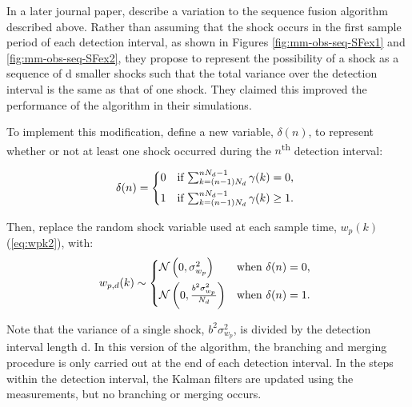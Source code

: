 In a later journal paper, \cite{robertson_method_1998} describe a variation to the sequence fusion algorithm described above.  Rather than assuming that the shock occurs in the first sample period of each detection interval, as shown in Figures \ref{fig:mm-obs-seq-SFex1} and \ref{fig:mm-obs-seq-SFex2}, they propose to represent the possibility of a shock as a sequence of \gls{d} smaller shocks such that the total variance over the detection interval is the same as that of one shock. They claimed this improved the performance of the algorithm in their simulations.

To implement this modification, define a new variable, $\delta(n)$, to represent whether or not at least one shock occurred during the $n$\textsuperscript{th} detection interval:

\begin{equation} \label{eq:deltak}
	\delta(n) = \begin{cases*}
		0 & \text{if} $\sum_{k=(n-1) N_d}^{n N_d - 1}{\gamma(k)} = 0$, \\
		1 & \text{if} $\sum_{k=(n-1) N_d}^{n N_d - 1}{\gamma(k)} \ge 1$.
	\end{cases*}
\end{equation}

Then, replace the random shock variable used at each sample time, $w_p(k)$ (\ref{eq:wpk2}), with:
\begin{equation} \label{eq:wpdk}
	w_{p,d}(k) \sim 
	\begin{cases*}
		\mathcal{N}\left(0, \sigma_{w_p}^2\right) & \text{when} $\delta(n) = 0$, \\
		\mathcal{N}\left(0, \frac{b^2\sigma_{w_p}^2}{N_d}\right) & \text{when} $\delta(n) = 1$.
	\end{cases*}
\end{equation}

Note that the variance of a single shock, $b^2\sigma_{w_p}^2$, is divided by the detection interval length \gls{d}. In this version of the algorithm, the branching and merging procedure is only carried out at the end of each detection interval. In the steps within the detection interval, the Kalman filters are updated using the measurements, but no branching or merging occurs.

